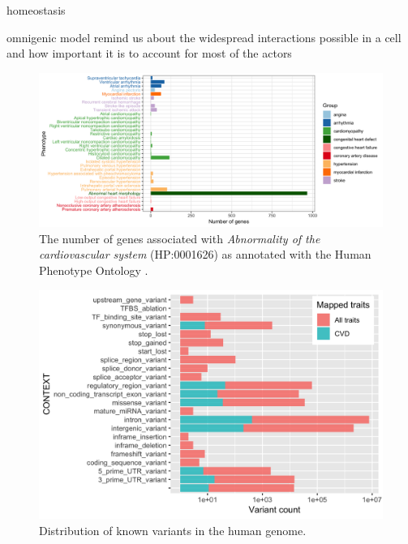 \documentclass[letter]{bioinfo}
\begin{document}
homeostasis

omnigenic model remind us about the widespread interactions possible in a cell and how important it is to account for most of the actors


\begin{figure}[!tpb]
	\includegraphics[width=1.\linewidth]{hpo-gene-count}
	\caption{The number of genes associated with \textit{Abnormality of the cardiovascular system} (HP:0001626) as annotated with the Human Phenotype Ontology \citep{Kohler:2014:Human}.}
	\label{fig:hpo_gene_count}	
\end{figure}

\begin{figure}[!tpb]
	\includegraphics[width=1\linewidth]{variant_contexts_sigVars}
	\caption{Distribution of known variants in the human genome.}
	\label{fig:variant_context}
\end{figure}
\end{document}
